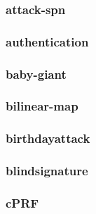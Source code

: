 \begin{frame}\frametitle{attack-spn}
\begin{figure}
\begin{center}

\end{center}
\end{figure}
\end{frame}
\begin{frame}\frametitle{authentication}
\begin{figure}
\begin{center}

\end{center}
\end{figure}
\end{frame}
\begin{frame}\frametitle{baby-giant}
\begin{figure}
\begin{center}

\end{center}
\end{figure}
\end{frame}
\begin{frame}\frametitle{bilinear-map}
\begin{figure}
\begin{center}

\end{center}
\end{figure}
\end{frame}
\begin{frame}\frametitle{birthdayattack}
\begin{figure}
\begin{center}

\end{center}
\end{figure}
\end{frame}
\begin{frame}\frametitle{blindsignature}
\begin{figure}
\begin{center}

\end{center}
\end{figure}
\end{frame}
\begin{frame}\frametitle{cPRF}
\begin{figure}
\begin{center}

\end{center}
\end{figure}
\end{frame}
